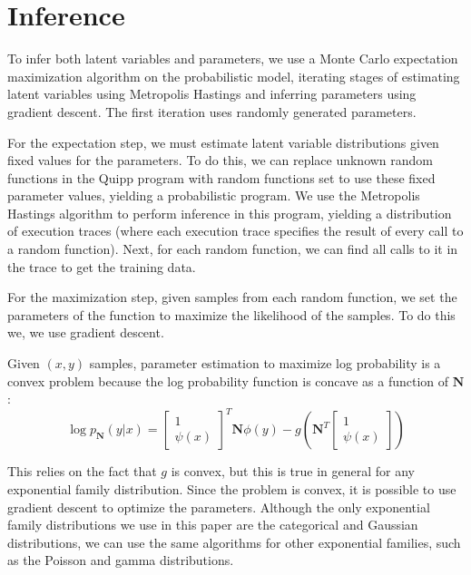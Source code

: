 \documentclass{article}
\begin{document}
  \section{Inference}

    To infer both latent variables and parameters, we use a Monte Carlo
    expectation maximization algorithm \cite{mcem} on the probabilistic model, iterating stages of
    estimating latent variables using Metropolis Hastings and inferring
    parameters using gradient descent.  The first iteration uses randomly generated parameters.

    For the expectation step, we must estimate latent variable distributions given
    fixed values for the parameters.  To do this, we can replace unknown random functions in the Quipp program
    with random functions set to use these fixed parameter values, yielding a probabilistic program.
    We use the Metropolis Hastings algorithm to perform inference in this program,
    yielding a distribution of execution traces (where each execution trace specifies the result of every
    call to a random function).  Next, for each random function, we can find all calls
    to it in the trace to get the training data.

    For the maximization step, given samples from each random function, we set the
    parameters of the function to maximize the likelihood of the samples.  To do this we,
    we use gradient descent.

    Given $(x, y)$ samples, parameter estimation to maximize log probability is a convex
    problem because the log probability function is concave as a function of $\mathbf{N}$:
    $$\log p_{\mathbf{N}}(y | x) = \begin{bmatrix} 1 \\ \psi(x) \end{bmatrix} ^T \mathbf{N} \phi(y) - g\left(\mathbf{N}^T \begin{bmatrix} 1 \\ \psi(x) \end{bmatrix}\right)$$

    This relies on the fact that $g$ is convex, but this is true in general for any exponential family distribution.
    Since the problem is convex, it is possible to use gradient descent to optimize the parameters.  Although
    the only exponential family distributions we use in this paper are the categorical and Gaussian distributions,
    we can use the same algorithms for other exponential families, such as the Poisson and gamma distributions.
\end{document}
